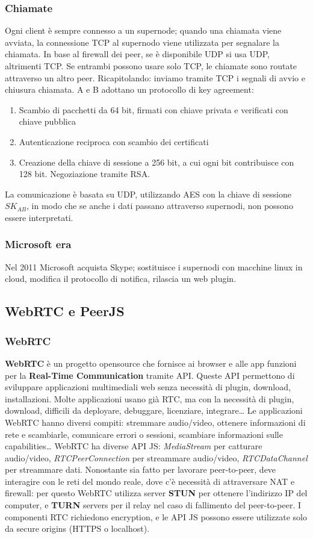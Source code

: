 \documentclass[11pt]{article}
\begin{document}
\subsubsection{Chiamate} Ogni client è sempre connesso a un supernode; quando una chiamata viene avviata, la connessione TCP al supernodo viene utilizzata per segnalare la chiamata. In base al firewall dei peer, se è disponibile UDP si usa UDP, altrimenti TCP. Se entrambi possono usare solo TCP, le chiamate sono routate attraverso un altro peer. Ricapitolando: inviamo tramite TCP i segnali di avvio e chiusura chiamata. A e B adottano un protocollo di key agreement:
\begin{enumerate}
    \item Scambio di pacchetti da 64 bit, firmati con chiave privata e verificati con chiave pubblica
    \item Autenticazione reciproca con scambio dei certificati 
    \item Creazione della chiave di sessione a 256 bit, a cui ogni bit contribuisce con 128 bit. Negoziazione tramite RSA.
\end{enumerate}
La comunicazione è basata su UDP, utilizzando AES con la chiave di sessione $SK_{AB}$, in modo che se anche i dati passano attraverso supernodi, non possono essere interpretati. 
\subsubsection{Microsoft era} Nel 2011 Microsoft acquista Skype; sostituisce i supernodi con macchine linux in cloud, modifica il protocollo di notifica, rilascia un web plugin.
\subsection{WebRTC e PeerJS}
\subsubsection{WebRTC} \textbf{WebRTC} è un progetto opensource che fornisce ai browser e alle app funzioni per la \textbf{Real-Time Communication} tramite API. Queste API permettono di sviluppare applicazioni multimediali web senza necessità di plugin, download, installazioni. Molte applicazioni usano già RTC, ma con la necessità di plugin, download, difficili da deployare, debuggare, licenziare, integrare\dots
Le applicazioni WebRTC hanno diversi compiti: stremmare audio/video, ottenere informazioni di rete e scambiarle, comunicare errori o sessioni, scambiare informazioni sulle capabilities\dots
WebRTC ha diverse API JS: \textit{MediaStream} per catturare audio/video, \textit{RTCPeerConnection} per streammare audio/video, \textit{RTCDataChannel} per streammare dati. Nonostante sia fatto per lavorare peer-to-peer, deve interagire con le reti del mondo reale, dove c'è necessità di attraversare NAT e firewall: per questo WebRTC utilizza server \textbf{STUN} per ottenere l'indirizzo IP del computer, e \textbf{TURN} servers per il relay nel caso di fallimento del peer-to-peer. I componenti RTC richiedono encryption, e le API JS possono essere utilizzate solo da secure origins (HTTPS o localhost). 
\end{document}
